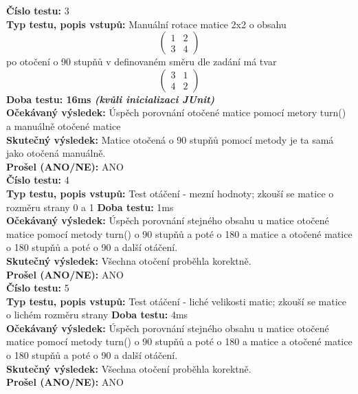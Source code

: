 \documentclass[a4paper,12pt]{article}
\begin{document}
     \textbf{Číslo testu:} 3\\
     \textbf{Typ testu, popis vstupů:} Manuální rotace matice 2x2 o obsahu
          \[\begin{pmatrix}
               1 & 2 \\
               3 & 4
          \end{pmatrix}\] po otočení o 90 stupňů v definovaném směru dle zadání má tvar\\
          \[\begin{pmatrix}
                    3 & 1\\
                    4 & 2
          \end{pmatrix}\]
     \textbf{Doba testu: 16ms \textit{(kvůli inicializaci JUnit)}} \\
     \textbf{Očekávaný výsledek:} Úspěch porovnání otočené matice pomocí metory turn() a manuálně otočené matice\\
     \textbf{Skutečný výsledek:} Matice otočená o 90 stupňů pomocí metody je ta samá jako otočená manuálně.\\
     \textbf{Prošel (ANO/NE):} ANO\\

     \textbf{Číslo testu:} 4\\
     \textbf{Typ testu, popis vstupů:} Test otáčení - mezní hodnoty; zkouší se matice o rozměru strany 0 a 1
     \textbf{Doba testu:} 1ms \\
     \textbf{Očekávaný výsledek:} Úspěch porovnání stejného obsahu u matice otočené matice pomocí metody turn()
     o 90 stupňů a poté o 180 a matice a otočené matice o 180 stupňů a poté o 90 a další otáčení.\\
     \textbf{Skutečný výsledek:} Všechna otočení proběhla korektně.\\
     \textbf{Prošel (ANO/NE):} ANO\\

     \textbf{Číslo testu:} 5\\
     \textbf{Typ testu, popis vstupů:} Test otáčení - liché velikosti matic; zkouší se matice o lichém rozměru strany
     \textbf{Doba testu:} 4ms \\
     \textbf{Očekávaný výsledek:} Úspěch porovnání stejného obsahu u matice otočené matice pomocí metody turn()
     o 90 stupňů a poté o 180 a matice a otočené matice o 180 stupňů a poté o 90 a další otáčení.\\
     \textbf{Skutečný výsledek:} Všechna otočení proběhla korektně.\\
     \textbf{Prošel (ANO/NE):} ANO\\
\end{document}
